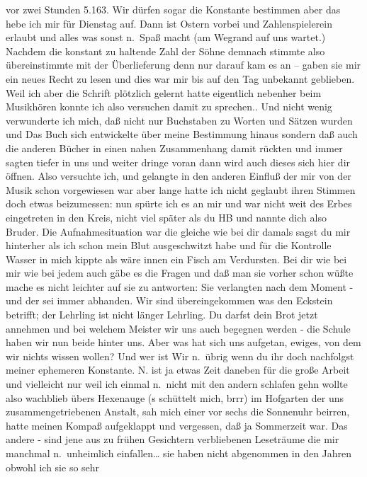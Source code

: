 \documentclass[
]{article}
\begin{document}
vor zwei Stunden 5.163. Wir dürfen sogar die Konstante bestimmen aber
das hebe ich mir für Dienstag auf. Dann ist Ostern vorbei und
Zahlenspielerein erlaubt und alles was sonst n.~Spaß macht (am Wegrand
auf uns wartet.)\\
Nachdem die konstant zu haltende Zahl der Söhne demnach stimmte also
übereinstimmte mit der Überlieferung denn nur darauf kam es an -- gaben
sie mir ein neues Recht zu lesen und dies war mir bis auf den Tag
unbekannt geblieben. Weil ich aber die Schrift plötzlich gelernt hatte
eigentlich nebenher beim Musikhören konnte ich also versuchen damit zu
sprechen.. Und nicht wenig verwunderte ich mich, daß nicht nur
Buchstaben zu Worten und Sätzen wurden und Das Buch sich entwickelte
über meine Bestimmung hinaus sondern daß auch die anderen Bücher in
einen nahen Zusammenhang damit rückten und immer sagten tiefer in uns
und weiter dringe voran dann wird auch dieses sich hier dir öffnen. Also
versuchte ich, und gelangte in den anderen Einfluß der mir von der Musik
schon vorgewiesen war aber lange hatte ich nicht geglaubt ihren Stimmen
doch etwas beizumessen: nun spürte ich es an mir und war nicht weit des
Erbes eingetreten in den Kreis, nicht viel später als du HB und nannte
dich also Bruder. Die Aufnahmesituation war die gleiche wie bei dir
damals sagst du mir hinterher als ich schon mein Blut ausgeschwitzt habe
und für die Kontrolle Wasser in mich kippte als wäre innen ein Fisch am
Verdursten. Bei dir wie bei mir wie bei jedem auch gäbe es die Fragen
und daß man sie vorher schon wüßte mache es nicht leichter auf sie zu
antworten: Sie verlangten nach dem Moment - und der sei immer abhanden.
Wir sind übereingekommen was den Eckstein betrifft; der Lehrling ist
nicht länger Lehrling. Du darfst dein Brot jetzt annehmen und bei
welchem Meister wir uns auch begegnen werden - die Schule haben wir nun
beide hinter uns. Aber was hat sich uns aufgetan, ewiges, von dem wir
nichts wissen wollen? Und wer ist Wir n.~übrig wenn du ihr doch
nachfolgst meiner ephemeren Konstante. N. ist ja etwas Zeit daneben für
die große Arbeit und vielleicht nur weil ich einmal n.~nicht mit den
andern schlafen gehn wollte also wachblieb übers Hexenauge
(\textquotesingle s schüttelt mich, brrr) im Hofgarten der uns
zusammengetriebenen Anstalt, sah mich einer vor sechs die Sonnenuhr
beirren, hatte meinen Kompaß aufgeklappt und vergessen, daß ja
Sommerzeit war. Das andere - sind jene aus zu frühen Gesichtern
verbliebenen Leseträume die mir manchmal n.~unheimlich einfallen\ldots{}
sie haben nicht abgenommen in den Jahren obwohl ich sie so sehr
\end{document}
